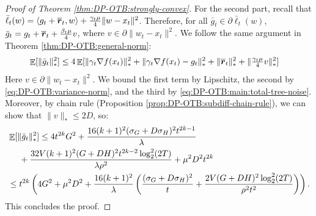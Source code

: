 \begin{proof}[Proof of Theorem \ref{thm:DP-OTB:strongly-convex}]
For the second part, recall that $\bar \ell_t(w)=\langle g_t+\overline{{\boldsymbol{r}}}_t,w\rangle + \frac{\gamma_t\mu}{4}\|w-x_t\|^2$. Therefore, for all $\bar g_t\in\partial \bar\ell_t(w)$, $\bar g_t = g_t+\overline{{\boldsymbol{r}}}_t + \frac{\beta_t\mu}{4}v$, where $v\in \partial\|w_t-x_t\|^2$.
We follow the same argument in Theorem \ref{thm:DP-OTB:general-norm}: 
\begin{align*}
    \mathop{\mathbb{E}}[\|\bar g_t\|_*^2]
    &\leq 4\mathop{\mathbb{E}}[\|\gamma_t\nabla f(x_t)\|_*^2 + \|\gamma_t\nabla f(x_t)-g_t\|_*^2 + \|\overline{{\boldsymbol{r}}}_t\|_*^2 + \|\tfrac{\gamma_t\mu}{4} v\|_*^2]
\end{align*}
Here $v\in\partial\|w_t-x_t\|^2$. We bound the first term by Lipschitz, the second by \eqref{eq:DP-OTB:variance-norm}, and the third by \eqref{eq:DP-OTB:main:total-tree-noise}. Moreover, by chain rule (Proposition \ref{prop:DP-OTB:subdiff-chain-rule}), we can show that $\|v\|_* \leq 2D$, so:
\begin{align*}
    &\mathop{\mathbb{E}}[\|\bar g_t\|_*^2] \leq 4t^{2k}G^2 + \frac{16(k+1)^2(\sigma_G+D\sigma_H)^2t^{2k-1}}{\lambda} \\
    &\quad \ + \frac{32V(k+1)^2(G+DH)^2t^{2k-2}\log_2^2(2T)}{\lambda\rho^2} + \mu^2D^2t^{2k} \\
    &\leq t^{2k}\left( 4G^2 + \mu^2D^2 + \frac{16(k+1)^2}{\lambda}\left(\frac{(\sigma_G+D\sigma_H)^2}{t} + \frac{2V(G+DH)^2\log_2^2(2T)}{\rho^2t^2}\right) \right).
\end{align*}
This concludes the proof.
\end{proof}

